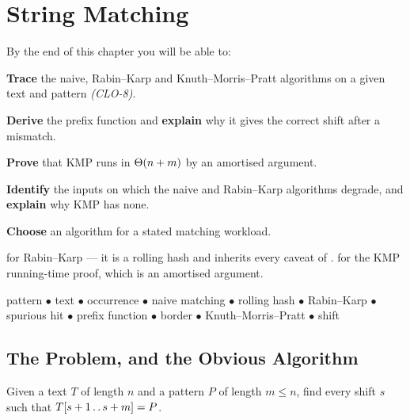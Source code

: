 \chapter{String Matching}\label{ch:strings}

\begin{outcomes}
By the end of this chapter you will be able to:
\begin{tight}
  \item \textbf{Trace} the naive, Rabin--Karp and Knuth--Morris--Pratt
        algorithms on a given text and pattern \emph{(CLO-8)}.
  \item \textbf{Derive} the prefix function and \textbf{explain} why it gives
        the correct shift after a mismatch.
  \item \textbf{Prove} that KMP runs in $\Theta(n+m)$ by an amortised argument.
  \item \textbf{Identify} the inputs on which the naive and Rabin--Karp
        algorithms degrade, and \textbf{explain} why KMP has none.
  \item \textbf{Choose} an algorithm for a stated matching workload.
\end{tight}
\end{outcomes}

\begin{prereq}
 for Rabin--Karp --- it is a rolling hash and inherits every
caveat of .  for the KMP running-time proof,
which is an amortised argument.
\end{prereq}

\begin{keyterms}
pattern $\bullet$ text $\bullet$ occurrence $\bullet$ naive matching $\bullet$
rolling hash $\bullet$ Rabin--Karp $\bullet$ spurious hit $\bullet$ prefix
function $\bullet$ border $\bullet$ Knuth--Morris--Pratt $\bullet$ shift
\end{keyterms}

\section{The Problem, and the Obvious Algorithm}

\begin{definitionbox}
Given a text $T$ of length $n$ and a pattern $P$ of length $m \le n$, find
every shift $s$ such that $T[s+1 \mathinner{\ldotp\ldotp} s+m] = P$.
\end{definitionbox}

